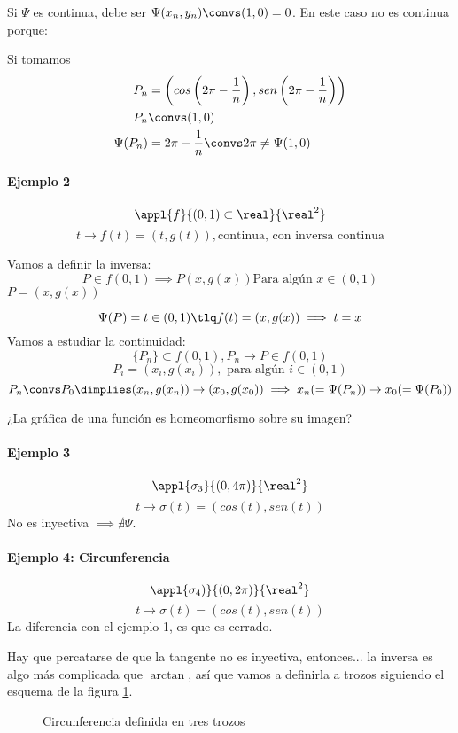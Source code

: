 Si $\Psi$ es continua, debe ser $\Psi(x_n,y_n) \convs (1,0) = 0$. En este caso no es continua porque:

Si tomamos \begin{align*}
P_n &= \left(cos\left(2\pi - \frac{1}{n}\right), sen\left(2\pi - \frac{1}{n}\right) \right)\\
P_n &\convs (1,0)\\
\Psi(P_n) &= 2\pi - \frac{1}{n} \convs 2\pi\neq\Psi(1,0)
\end{align*}

\paragraph{Ejemplo 2}

\[\appl{f}{(0,1)\subset\real}{\real^2}\]
\[t \rightarrow f(t) = (t,g(t)), \text{continua, con inversa continua}\]

Vamos a definir la  inversa:
\[P\in f(0,1) \implies P(x,g(x)) \text{Para algún } x\in(0,1)\]
$P = (x,g(x))$

\[\Psi(P) = t \in (0,1) \tlq f(t) = (x,g(x)) \implies t = x\]
Vamos a estudiar la continuidad:
\[\{P_n\} \subset f(0,1), P_n \rightarrow P \in f(0,1)\]
\[P_i = (x_i,g(x_i)), \text{ para algún } i \in (0,1)\]
\[P_n \convs P_0 \dimplies (x_n,g(x_n)) \rightarrow (x_0,g(x_0)) \implies x_n (= \Psi(P_n)) \rightarrow x_0 (=\Psi(P_0)) \]

\obs ¿La gráfica de una función es homeomorfismo sobre su imagen?
\paragraph{Ejemplo 3}
\[\appl{\sigma_3}{(0,4\pi)}{\real^2}\]
\[t \rightarrow \sigma(t) = (cos(t),sen(t))\]
No es inyectiva $\implies \nexists \Psi$.

\paragraph{Ejemplo 4: Circunferencia}
\[\appl{\sigma_4)}{(0,2\pi)}{\real^2}\]
\[t \rightarrow \sigma(t) = (cos(t),sen(t))\]
La diferencia con el ejemplo 1, es que es cerrado.

Hay que percatarse de que la tangente no es inyectiva, entonces... la inversa es algo más complicada que $\arctan$, así que vamos a definirla a trozos siguiendo el esquema de la figura \ref{imgCirc_2}.

\begin{figure}[hbtp]
\begin{center}
\caption{Circunferencia definida en tres trozos}
\label{imgCirc_2}
\end{center}
\end{figure}


